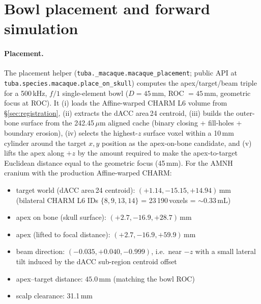 \documentclass{compactarticle}
\begin{document}
\section{Bowl placement and forward simulation}
\label{sec:simulation}

\paragraph{Placement.}
The placement helper
(\texttt{tuba.\_macaque.\allowbreak macaque\_placement}; public API at \texttt{tuba.species.macaque.place\_on\_skull})
computes the apex/target/beam triple for a 500\,kHz, $f/1$
single-element bowl ($D = 45$\,mm, ROC $=45$\,mm, geometric focus at
ROC). It (i) loads the Affine-warped CHARM L6 volume from
\S\ref{sec:registration}, (ii) extracts the dACC area\,24 centroid,
(iii) builds the outer-bone surface from the 242.45\,$\mu$m aligned
cache (binary closing + fill-holes + boundary erosion), (iv) selects
the highest-$z$ surface voxel within a 10\,mm cylinder around the
target $x, y$ position as the apex-on-bone candidate, and (v) lifts
the apex along $+z$ by the amount required to make the
apex-to-target Euclidean distance equal to the geometric focus
(45\,mm). For the AMNH cranium with the production Affine-warped CHARM:
\begin{itemize}[leftmargin=*]
\setlength\itemsep{0pt}
  \item target world (dACC area\,24 centroid):
        $(+1.14, -15.15, +14.94)$\,mm  (bilateral CHARM L6 IDs
        $\{8, 9, 13, 14\}$ = 23\,190\,voxels = $\sim$0.33\,mL)
  \item apex on bone (skull surface): $(+2.7, -16.9, +28.7)$\,mm
  \item apex (lifted to focal distance): $(+2.7, -16.9, +59.9)$\,mm
  \item beam direction: $(-0.035, +0.040, -0.999)$, i.e.\ near $-z$
        with a small lateral tilt induced by the dACC sub-region
        centroid offset
  \item apex--target distance: $45.0$\,mm (matching the bowl ROC)
  \item scalp clearance: 31.1\,mm
\end{itemize}
\end{document}
